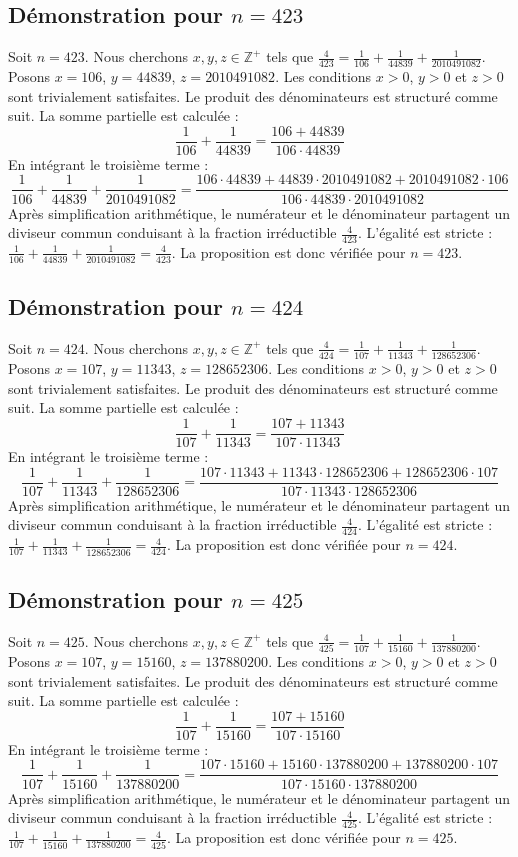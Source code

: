 \documentclass[11pt,a4paper]{article}
\begin{document}
\subsection{Démonstration pour $n = 423$}
Soit $n = 423$. Nous cherchons $x, y, z \in \mathbb{Z}^{+}$ tels que $\frac{4}{423} = \frac{1}{106} + \frac{1}{44839} + \frac{1}{2010491082}$.
Posons $x = 106$, $y = 44839$, $z = 2010491082$.
Les conditions $x > 0$, $y > 0$ et $z > 0$ sont trivialement satisfaites.
Le produit des dénominateurs est structuré comme suit. La somme partielle est calculée :
$$ \frac{1}{106} + \frac{1}{44839} = \frac{106+44839}{106 \cdot 44839} $$
En intégrant le troisième terme :
$$ \frac{1}{106} + \frac{1}{44839} + \frac{1}{2010491082} = \frac{106 \cdot 44839 + 44839 \cdot 2010491082 + 2010491082 \cdot 106}{106 \cdot 44839 \cdot 2010491082} $$
Après simplification arithmétique, le numérateur et le dénominateur partagent un diviseur commun conduisant à la fraction irréductible $\frac{4}{423}$.
L'égalité est stricte : $\frac{1}{106} + \frac{1}{44839} + \frac{1}{2010491082} = \frac{4}{423}$.
La proposition est donc vérifiée pour $n = 423$.
\subsection{Démonstration pour $n = 424$}
Soit $n = 424$. Nous cherchons $x, y, z \in \mathbb{Z}^{+}$ tels que $\frac{4}{424} = \frac{1}{107} + \frac{1}{11343} + \frac{1}{128652306}$.
Posons $x = 107$, $y = 11343$, $z = 128652306$.
Les conditions $x > 0$, $y > 0$ et $z > 0$ sont trivialement satisfaites.
Le produit des dénominateurs est structuré comme suit. La somme partielle est calculée :
$$ \frac{1}{107} + \frac{1}{11343} = \frac{107+11343}{107 \cdot 11343} $$
En intégrant le troisième terme :
$$ \frac{1}{107} + \frac{1}{11343} + \frac{1}{128652306} = \frac{107 \cdot 11343 + 11343 \cdot 128652306 + 128652306 \cdot 107}{107 \cdot 11343 \cdot 128652306} $$
Après simplification arithmétique, le numérateur et le dénominateur partagent un diviseur commun conduisant à la fraction irréductible $\frac{4}{424}$.
L'égalité est stricte : $\frac{1}{107} + \frac{1}{11343} + \frac{1}{128652306} = \frac{4}{424}$.
La proposition est donc vérifiée pour $n = 424$.
\subsection{Démonstration pour $n = 425$}
Soit $n = 425$. Nous cherchons $x, y, z \in \mathbb{Z}^{+}$ tels que $\frac{4}{425} = \frac{1}{107} + \frac{1}{15160} + \frac{1}{137880200}$.
Posons $x = 107$, $y = 15160$, $z = 137880200$.
Les conditions $x > 0$, $y > 0$ et $z > 0$ sont trivialement satisfaites.
Le produit des dénominateurs est structuré comme suit. La somme partielle est calculée :
$$ \frac{1}{107} + \frac{1}{15160} = \frac{107+15160}{107 \cdot 15160} $$
En intégrant le troisième terme :
$$ \frac{1}{107} + \frac{1}{15160} + \frac{1}{137880200} = \frac{107 \cdot 15160 + 15160 \cdot 137880200 + 137880200 \cdot 107}{107 \cdot 15160 \cdot 137880200} $$
Après simplification arithmétique, le numérateur et le dénominateur partagent un diviseur commun conduisant à la fraction irréductible $\frac{4}{425}$.
L'égalité est stricte : $\frac{1}{107} + \frac{1}{15160} + \frac{1}{137880200} = \frac{4}{425}$.
La proposition est donc vérifiée pour $n = 425$.
\end{document}
